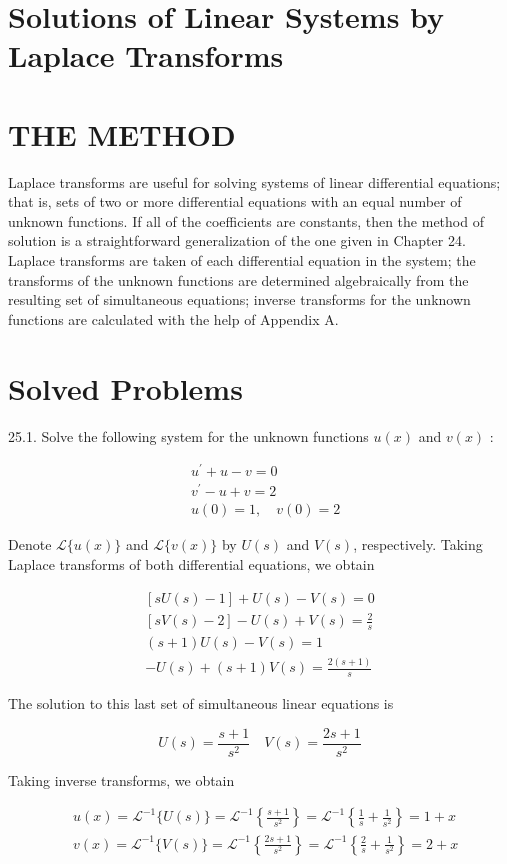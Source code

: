 \documentclass[10pt]{article}
\begin{document}
\section*{Solutions of Linear Systems by Laplace Transforms}
\section*{THE METHOD}
Laplace transforms are useful for solving systems of linear differential equations; that is, sets of two or more differential equations with an equal number of unknown functions. If all of the coefficients are constants, then the method of solution is a straightforward generalization of the one given in Chapter 24. Laplace transforms are taken of each differential equation in the system; the transforms of the unknown functions are determined algebraically from the resulting set of simultaneous equations; inverse transforms for the unknown functions are calculated with the help of Appendix A.

\section*{Solved Problems}
25.1. Solve the following system for the unknown functions $u(x)$ and $v(x)$ :

$$
\begin{aligned}
& u^{\prime}+u-v=0 \\
& v^{\prime}-u+v=2 \\
& u(0)=1, \quad v(0)=2
\end{aligned}
$$

Denote $\mathscr{L}\{u(x)\}$ and $\mathscr{L}\{v(x)\}$ by $U(s)$ and $V(s)$, respectively. Taking Laplace transforms of both differential equations, we obtain

$$
\begin{gathered}
{[s U(s)-1]+U(s)-V(s)=0} \\
{[s V(s)-2]-U(s)+V(s)=\frac{2}{s}} \\
(s+1) U(s)-V(s)=1 \\
-U(s)+(s+1) V(s)=\frac{2(s+1)}{s}
\end{gathered}
$$

The solution to this last set of simultaneous linear equations is

$$
U(s)=\frac{s+1}{s^{2}} \quad V(s)=\frac{2 s+1}{s^{2}}
$$

Taking inverse transforms, we obtain

$$
\begin{aligned}
& u(x)=\mathscr{L}^{-1}\{U(s)\}=\mathscr{L}^{-1}\left\{\frac{s+1}{s^{2}}\right\}=\mathscr{L}^{-1}\left\{\frac{1}{s}+\frac{1}{s^{2}}\right\}=1+x \\
& v(x)=\mathscr{L}^{-1}\{V(s)\}=\mathscr{L}^{-1}\left\{\frac{2 s+1}{s^{2}}\right\}=\mathscr{L}^{-1}\left\{\frac{2}{s}+\frac{1}{s^{2}}\right\}=2+x
\end{aligned}
$$
\end{document}
